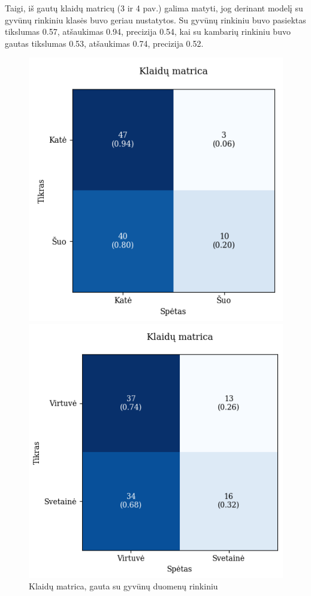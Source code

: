 \documentclass{VUMIFPSbakalaurinis}
\begin{document}
Taigi, iš gautų klaidų matricų (3 ir 4 pav.) galima matyti, jog derinant modelį su gyvūnų rinkiniu klasės buvo geriau nustatytos. 
Su gyvūnų rinkiniu buvo pasiektas tikslumas 0.57, atšaukimas 0.94, precizija 0.54, kai su kambarių rinkiniu buvo gautas tikslumas 0.53, atšaukimas 0.74, precizija 0.52.
\begin{figure}[!htbp]
    \centering
    \begin{minipage}[b]{0.48\textwidth}
      \includegraphics[width=\textwidth]{img/GrapthsNEW/Small/animal/5/KM_DC_S_5.png}
      \caption{Klaidų matrica, gauta su gyvūnų duomenų rinkiniu}
    \end{minipage}
    \hspace{2mm}
    \begin{minipage}[b]{0.48\textwidth}
      \includegraphics[width=\textwidth]{img/GrapthsNEW/Small/room/5/KM_R_S_5.png}

\end{minipage}
\end{figure}
\end{document}
